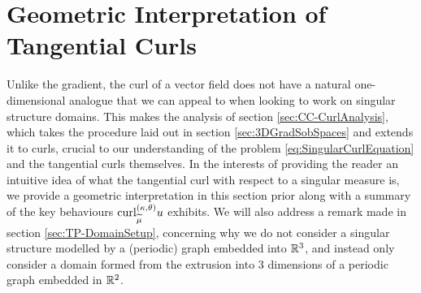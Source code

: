 \section{Geometric Interpretation of Tangential Curls} \label{sec:CC-Geometric}
Unlike the gradient, the curl of a vector field does not have a natural one-dimensional analogue that we can appeal to when looking to work on singular structure domains.
This makes the analysis of section \ref{sec:CC-CurlAnalysis}, which takes the procedure laid out in section \ref{sec:3DGradSobSpaces} and extends it to curls, crucial to our understanding of the problem \eqref{eq:SingularCurlEquation} and the tangential curls themselves.
In the interests of providing the reader an intuitive idea of what the tangential curl with respect to a singular measure is, we provide a geometric interpretation in this section prior along with a summary of the key behaviours $\mathrm{curl}_{\widetilde{\mu}}^{\left( \kappa, \theta \right)}u$ exhibits.
We will also address a remark made in section \ref{sec:TP-DomainSetup}, concerning why we do not consider a singular structure modelled by a (periodic) graph embedded into $\mathbb{R}^3$, and instead only consider a domain formed from the extrusion into 3 dimensions of a periodic graph embedded in $\mathbb{R}^2$.


